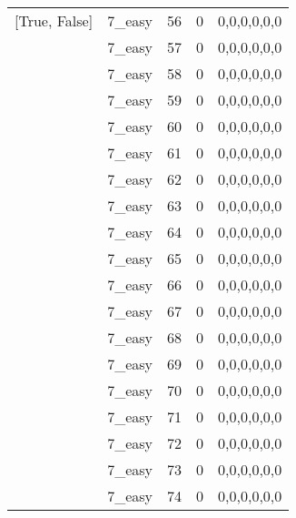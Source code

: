 \begin{tabular}{llrrl}
 [True, False]   & 7\_easy              &            56 &                     0 & 0,0,0,0,0,0   \\
 [True, False]   & 7\_easy              &            57 &                     0 & 0,0,0,0,0,0   \\
 [True, False]   & 7\_easy              &            58 &                     0 & 0,0,0,0,0,0   \\
 [True, False]   & 7\_easy              &            59 &                     0 & 0,0,0,0,0,0   \\
 [True, False]   & 7\_easy              &            60 &                     0 & 0,0,0,0,0,0   \\
 [True, False]   & 7\_easy              &            61 &                     0 & 0,0,0,0,0,0   \\
 [True, False]   & 7\_easy              &            62 &                     0 & 0,0,0,0,0,0   \\
 [True, False]   & 7\_easy              &            63 &                     0 & 0,0,0,0,0,0   \\
 [True, False]   & 7\_easy              &            64 &                     0 & 0,0,0,0,0,0   \\
 [True, False]   & 7\_easy              &            65 &                     0 & 0,0,0,0,0,0   \\
 [True, False]   & 7\_easy              &            66 &                     0 & 0,0,0,0,0,0   \\
 [True, False]   & 7\_easy              &            67 &                     0 & 0,0,0,0,0,0   \\
 [True, False]   & 7\_easy              &            68 &                     0 & 0,0,0,0,0,0   \\
 [True, False]   & 7\_easy              &            69 &                     0 & 0,0,0,0,0,0   \\
 [True, False]   & 7\_easy              &            70 &                     0 & 0,0,0,0,0,0   \\
 [True, False]   & 7\_easy              &            71 &                     0 & 0,0,0,0,0,0   \\
 [True, False]   & 7\_easy              &            72 &                     0 & 0,0,0,0,0,0   \\
 [True, False]   & 7\_easy              &            73 &                     0 & 0,0,0,0,0,0   \\
 [True, False]   & 7\_easy              &            74 &                     0 & 0,0,0,0,0,0   \\

\end{tabular}

